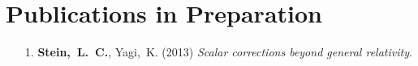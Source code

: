 \section{\sc Publications in Preparation}
\begin{enumerate}
\item[{1.}] {\bf Stein,~L.~C.}, Yagi,~K. (2013)
  {\it Scalar corrections beyond general relativity}.
\end{enumerate}


